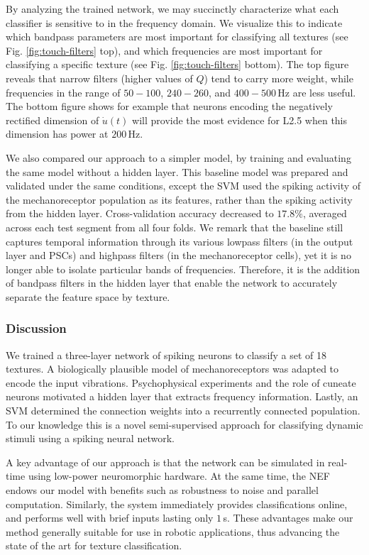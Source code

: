 By analyzing the trained network, we may succinctly characterize what each classifier is sensitive to in the frequency domain. We visualize this to indicate which bandpass parameters are most important for classifying all textures (see Fig. \ref{fig:touch-filters} top), and which frequencies are most important for classifying a specific texture (see Fig. \ref{fig:touch-filters} bottom). 
The top figure reveals that narrow filters (higher values of $Q$) tend to carry more weight, while frequencies in the range of $50 - 100$, $240 - 260$, and $400 - 500$\,Hz are less useful. The bottom figure shows for example that neurons encoding the negatively rectified dimension of $\dot{u}(t)$ will provide the most evidence for L2.5 when this dimension has power at $200$\,Hz. 

We also compared our approach to a simpler model, 
by training and evaluating the same model without a hidden layer. This baseline model was prepared and validated under the same conditions, except the SVM used the spiking activity of the mechanoreceptor population as its features, rather than the spiking activity from the hidden layer.  Cross-validation accuracy decreased to $17.8\%$, averaged across each test segment from all four folds.
We remark that the baseline still captures temporal information through its various lowpass filters (in the output layer and PSCs) and highpass filters (in the mechanoreceptor cells), yet it is no longer able to isolate particular bands of frequencies. Therefore, it is the addition of bandpass filters in the hidden layer that enable the network to accurately separate the feature space by texture.

\subsubsection{Discussion}

We trained a three-layer network of spiking neurons to classify a set of 18 textures. A biologically plausible model of mechanoreceptors was adapted to encode the input vibrations. Psychophysical experiments and the role of cuneate neurons motivated a hidden layer that extracts frequency information. Lastly, an SVM determined the connection weights into a recurrently connected population. To our knowledge this is a novel semi-supervised approach for classifying dynamic stimuli using a spiking neural network.

A key advantage of our approach is that the network can be simulated in real-time using low-power neuromorphic hardware. At the same time, the NEF endows our model with benefits such as robustness to noise  and parallel computation. Similarly, the system immediately provides classifications online, and performs well with brief inputs lasting only $1$\,s.  These advantages make our method generally suitable for use in robotic applications, thus advancing the state of the art for texture classification. %

